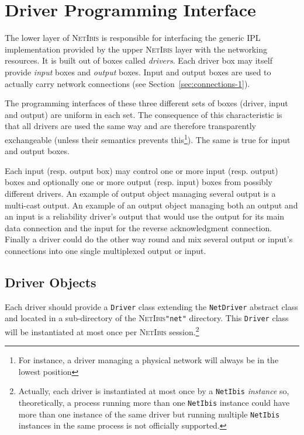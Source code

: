 \documentclass[11pt]{book}
\def\NetIbis{\textsc{NetIbis}\xspace}
\begin{document}
\section{Driver Programming Interface}
\label{sec:driv-progr-interf}

The lower layer of \NetIbis is responsible for interfacing the generic
IPL implementation provided by the upper \NetIbis layer with the
networking resources. It is built out of boxes called \emph{drivers}.
Each driver box may itself provide \emph{input} boxes and
\emph{output} boxes. Input and output boxes are used to actually carry
network connections (see Section~\ref{sec:connections-1}).

The programming interfaces of these three different sets of boxes
(driver, input and output) are uniform in each set. The consequence of
this characteristic is that all drivers are used the same way and are
therefore transparently exchangeable (unless their semantics prevents
this\footnote{For instance, a driver managing a physical network will
  always be in the lowest position}). The same is true for input and
output boxes.

Each input (resp. output box) may control one or more input (resp.
output) boxes and optionally one or more output (resp. input) boxes
from possibly different drivers. An example of output object managing
several output is a multi-cast output. An example of an output object
managing both an output and an input is a reliability driver's output
that would use the output for its main data connection and the input
for the reverse acknowledgment connection. Finally a driver could do
the other way round and mix several output or input's connections into
one single multiplexed output or input.

\subsection{Driver Objects}
\label{sec:driver-objects}

Each driver should provide a \texttt{Driver} class extending the
\texttt{NetDriver} abstract class and located in a sub-directory of
the \NetIbis \texttt{"net"} directory. This \texttt{Driver} class will
be instantiated at most once per \NetIbis session.\footnote{Actually,
  each driver is instantiated at most once by a \texttt{NetIbis} \emph{instance}
  so, theoretically, a process running more than one \texttt{NetIbis}
  instance could have more than one instance of the same driver but
  running multiple \texttt{NetIbis} instances in the same process is
  not officially supported.}
\end{document}
